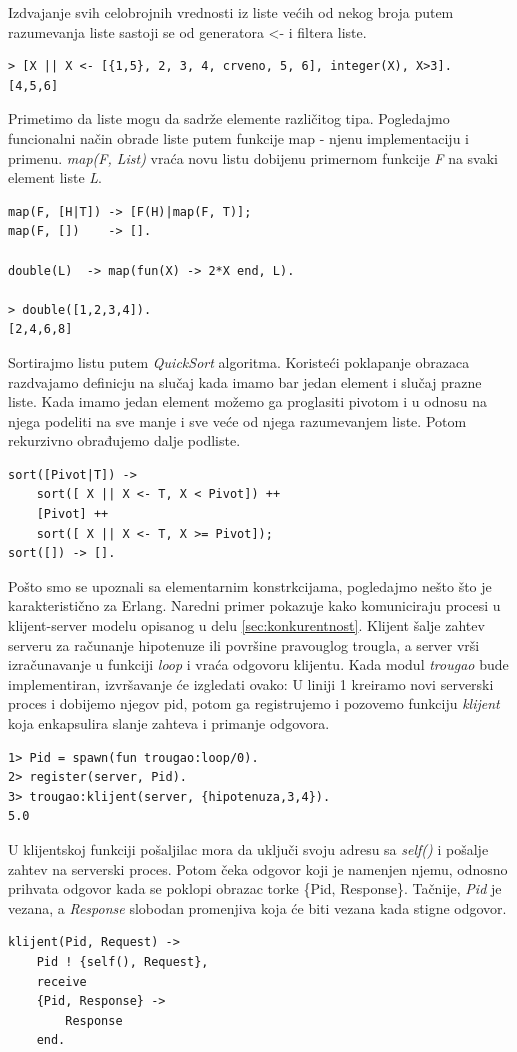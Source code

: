 \documentclass[a4paper]{article}
\begin{document}
{Izdvajanje svih celobrojnih vrednosti iz liste većih od nekog broja putem razumevanja liste sastoji se od generatora <- i filtera liste.
\begin{verbatim}
> [X || X <- [{1,5}, 2, 3, 4, crveno, 5, 6], integer(X), X>3].
[4,5,6]
\end{verbatim}

Primetimo da liste mogu da sadrže elemente različitog tipa.
Pogledajmo funcionalni način obrade liste putem funkcije map - njenu implementaciju i primenu.
{\em map(F, List)} vraća novu listu dobijenu primernom funkcije {\em F} na svaki element liste {\em L}.
\begin{verbatim}
map(F, [H|T]) -> [F(H)|map(F, T)];
map(F, [])    -> [].

double(L)  -> map(fun(X) -> 2*X end, L).

> double([1,2,3,4]).
[2,4,6,8]
\end{verbatim}

Sortirajmo listu putem {\em QuickSort} algoritma. 
Koristeći poklapanje obrazaca razdvajamo definicju na slučaj kada imamo bar jedan 
element i slučaj prazne liste. Kada imamo jedan element možemo ga proglasiti pivotom i u odnosu na njega podeliti na sve manje i sve veće od njega razumevanjem liste.
Potom rekurzivno obrađujemo dalje podliste.
\begin{verbatim}
sort([Pivot|T]) ->
    sort([ X || X <- T, X < Pivot]) ++
    [Pivot] ++
    sort([ X || X <- T, X >= Pivot]);
sort([]) -> [].
\end{verbatim}

Pošto smo se upoznali sa elementarnim konstrkcijama, pogledajmo nešto što je 
karakteristično za Erlang. Naredni primer pokazuje kako komuniciraju procesi u klijent-server modelu opisanog u delu \ref{sec:konkurentnost}.
Klijent šalje zahtev serveru za računanje hipotenuze ili površine pravouglog trougla,
a server vrši izračunavanje u funkciji {\em loop} i vraća odgovoru klijentu. 
Kada modul {\em trougao} bude implementiran, izvršavanje će izgledati ovako: U liniji 1 kreiramo novi serverski proces i dobijemo njegov pid, 
potom ga registrujemo i pozovemo funkciju {\em klijent} koja enkapsulira slanje zahteva i primanje odgovora.
\begin{verbatim}
1> Pid = spawn(fun trougao:loop/0).
2> register(server, Pid).
3> trougao:klijent(server, {hipotenuza,3,4}).
5.0
\end{verbatim}

U klijentskoj funkciji pošaljilac mora da uključi svoju adresu sa {\em self()} i pošalje zahtev na serverski proces.
Potom čeka odgovor koji je namenjen njemu, odnosno prihvata odgovor kada se poklopi obrazac torke \{Pid, Response\}. Tačnije, {\em Pid} je vezana, a {\em Response} slobodan promenjiva koja će biti vezana kada stigne odgovor.
\begin{verbatim}
klijent(Pid, Request) ->
    Pid ! {self(), Request},
    receive
	{Pid, Response} ->
	    Response
    end.
\end{verbatim}

}
\end{document}
